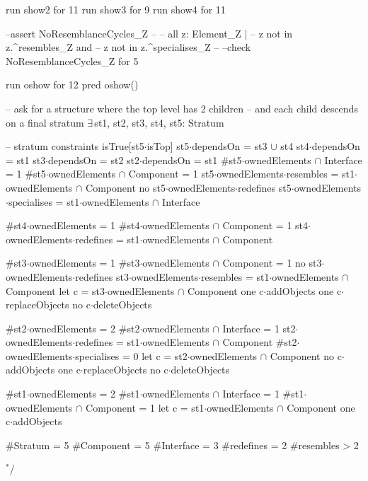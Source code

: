 run show2 for 11
run show3 for 9
run show4 for 11


--assert NoResemblanceCycles_Z
--{
--  all z: Element_Z |
--    z not in z.^resembles_Z and
--    z not in z.^specialises_Z
--}
--check NoResemblanceCycles_Z for 5


run oshow for 12
pred oshow()
{
  -- ask for a structure where the top level has 2 children
  -- and each child descends on a final stratum
  $\exists\,$st1, st2, st3, st4, st5: Stratum
  {
    -- stratum constraints
    isTrue[st5$\cdot$isTop]
    st5$\cdot$dependsOn = st3 $\cup$ st4
    st4$\cdot$dependsOn = st1
    st3$\cdot$dependsOn = st2
    st2$\cdot$dependsOn = st1
    #st5$\cdot$ownedElements $\cap$ Interface = 1
    #st5$\cdot$ownedElements $\cap$ Component = 1
    st5$\cdot$ownedElements$\cdot$resembles = st1$\cdot$ownedElements $\cap$ Component
    no st5$\cdot$ownedElements$\cdot$redefines
    st5$\cdot$ownedElements$\cdot$specialises = st1$\cdot$ownedElements $\cap$ Interface
    
    #st4$\cdot$ownedElements = 1
    #st4$\cdot$ownedElements $\cap$ Component = 1
    st4$\cdot$ownedElements$\cdot$redefines = st1$\cdot$ownedElements $\cap$ Component

    #st3$\cdot$ownedElements = 1
    #st3$\cdot$ownedElements $\cap$ Component = 1
    no st3$\cdot$ownedElements$\cdot$redefines
    st3$\cdot$ownedElements$\cdot$resembles = st1$\cdot$ownedElements $\cap$ Component
    let c = st3$\cdot$ownedElements $\cap$ Component
    {
      one c$\cdot$addObjects
      one c$\cdot$replaceObjects
      no c$\cdot$deleteObjects
    }

    #st2$\cdot$ownedElements = 2
    #st2$\cdot$ownedElements $\cap$ Interface = 1
    st2$\cdot$ownedElements$\cdot$redefines = st1$\cdot$ownedElements $\cap$ Component  
    #st2$\cdot$ownedElements$\cdot$specialises = 0
    let c = st2$\cdot$ownedElements $\cap$ Component
    {
      no c$\cdot$addObjects
      one c$\cdot$replaceObjects
      no c$\cdot$deleteObjects
    }
    
    #st1$\cdot$ownedElements = 2
    #st1$\cdot$ownedElements $\cap$ Interface = 1
    #st1$\cdot$ownedElements $\cap$ Component = 1
    let c = st1$\cdot$ownedElements $\cap$ Component
    {
      one c$\cdot$addObjects
    }
  }
  
  #Stratum = 5
  #Component = 5
  #Interface = 3
  #redefines = 2
  #resembles > 2
}
 $\!\!\!^\ast\!$/
